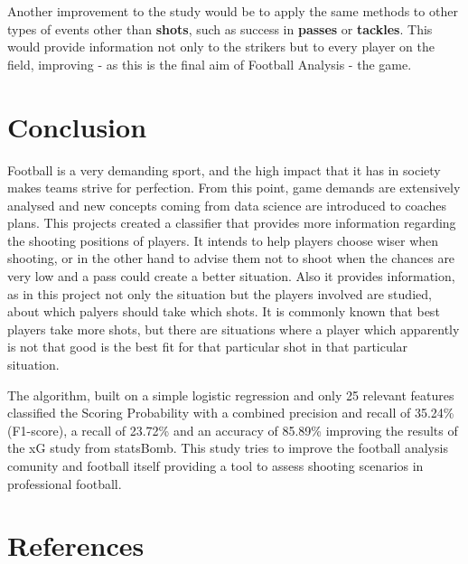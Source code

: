 \documentclass[]{article}
\begin{document}
Another improvement to the study would be to apply the same methods to
other types of events other than \textbf{shots}, such as success in
\textbf{passes} or \textbf{tackles}. This would provide information not
only to the strikers but to every player on the field, improving - as
this is the final aim of Football Analysis - the game.

\hypertarget{conclusion}{%
\section{Conclusion}\label{conclusion}}

Football is a very demanding sport, and the high impact that it has in
society makes teams strive for perfection. From this point, game demands
are extensively analysed and new concepts coming from data science are
introduced to coaches plans. This projects created a classifier that
provides more information regarding the shooting positions of players.
It intends to help players choose wiser when shooting, or in the other
hand to advise them not to shoot when the chances are very low and a
pass could create a better situation. Also it provides information, as
in this project not only the situation but the players involved are
studied, about which palyers should take which shots. It is commonly
known that best players take more shots, but there are situations where
a player which apparently is not that good is the best fit for that
particular shot in that particular situation.

The algorithm, built on a simple logistic regression and only 25
relevant features classified the Scoring Probability with a combined
precision and recall of 35.24\% (F1-score), a recall of 23.72\% and an
accuracy of 85.89\% improving the results of the xG study from
statsBomb. This study tries to improve the football analysis comunity
and football itself providing a tool to assess shooting scenarios in
professional football.

\hypertarget{references}{%
\section*{References}\label{references}}
\end{document}

